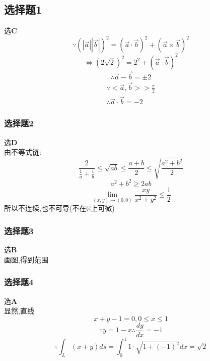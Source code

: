 \documentclass[a4paper,12pt]{ctexrep}
\begin{document}
\subsection{选择题1}
选\textbf{C}
\begin{equation*}
	\because\left(|\overrightarrow{a}||\overrightarrow{b}|\right)^2=\left(\overrightarrow{a}\cdot\overrightarrow{b}\right)^2+\left(\overrightarrow{a}\times\overrightarrow{b}\right)^2
\end{equation*}
\begin{equation*}
	\Leftrightarrow(2\sqrt{2})^{2}=2^{2}+(\overrightarrow{a}\cdot\overrightarrow{b})^{2}
\end{equation*}
\begin{equation*}
\therefore\overrightarrow{a}-\overrightarrow{b}=\pm2
\end{equation*}
\begin{equation*}
\begin{aligned}\because<\overrightarrow{a},\overrightarrow{b}>>\frac{\pi}{2}
		\\
\therefore\overrightarrow{a}\cdot\overrightarrow{b}=-2\end{aligned}\end{equation*}

\subsubsection{选择题2}
选\textbf{D} \\
由不等式链:
\begin{equation*}
\frac{2}{\frac{1}{a}+\frac{1}{b}}\leq\sqrt{ab}\leq\frac{a+b}{2}\leq\sqrt{\frac{a^{2}+b^{2}}{2}}
\end{equation*}
\begin{equation*}
	a^{2}+b^{2}\geq2ab
\end{equation*}
\begin{equation*}
	\operatorname*{lim}_{(x,y)\rightarrow(0,0)}\frac{xy}{x^2+y^2}\leq\frac{1}{2}
\end{equation*}
所以不连续,也不可导(不在$\mathbb{R}$上可微)

\subsubsection{选择题3}
选\textbf{B} \\
画图,得到范围

\subsubsection{选择题4}
选\textbf{A} \\
显然,直线\begin{equation*}
	x+y-1=0,0\leq x\leq1
\end{equation*}
\begin{equation*}
	\because y=1-x\therefore\frac{dy}{dx}=-1
\end{equation*}
\begin{equation*}
\therefore\int_{L}(x+y)ds=\int_{0}^{1}1\cdot\sqrt{1+(-1)^{2}}dx=\sqrt{2}
\end{equation*}
\end{document}
